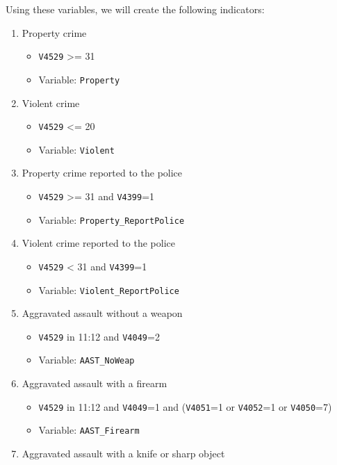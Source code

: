 \documentclass[
]{krantz}
\providecommand{\tightlist}{%
  \setlength{\itemsep}{0pt}\setlength{\parskip}{0pt}}
\begin{document}
Using these variables, we will create the following indicators:

\begin{enumerate}
\def\labelenumi{\arabic{enumi}.}
\tightlist
\item
  Property crime

  \begin{itemize}
  \tightlist
  \item
    \texttt{V4529} \textgreater= 31
  \item
    Variable: \texttt{Property}
  \end{itemize}
\item
  Violent crime

  \begin{itemize}
  \tightlist
  \item
    \texttt{V4529} \textless= 20
  \item
    Variable: \texttt{Violent}
  \end{itemize}
\item
  Property crime reported to the police

  \begin{itemize}
  \tightlist
  \item
    \texttt{V4529} \textgreater= 31 and \texttt{V4399}=1
  \item
    Variable: \texttt{Property\_ReportPolice}
  \end{itemize}
\item
  Violent crime reported to the police

  \begin{itemize}
  \tightlist
  \item
    \texttt{V4529} \textless{} 31 and \texttt{V4399}=1
  \item
    Variable: \texttt{Violent\_ReportPolice}
  \end{itemize}
\item
  Aggravated assault without a weapon

  \begin{itemize}
  \tightlist
  \item
    \texttt{V4529} in 11:12 and \texttt{V4049}=2
  \item
    Variable: \texttt{AAST\_NoWeap}
  \end{itemize}
\item
  Aggravated assault with a firearm

  \begin{itemize}
  \tightlist
  \item
    \texttt{V4529} in 11:12 and \texttt{V4049}=1 and (\texttt{V4051}=1 or \texttt{V4052}=1 or \texttt{V4050}=7)
  \item
    Variable: \texttt{AAST\_Firearm}
  \end{itemize}
\item
  Aggravated assault with a knife or sharp object


\end{enumerate}
\end{document}
